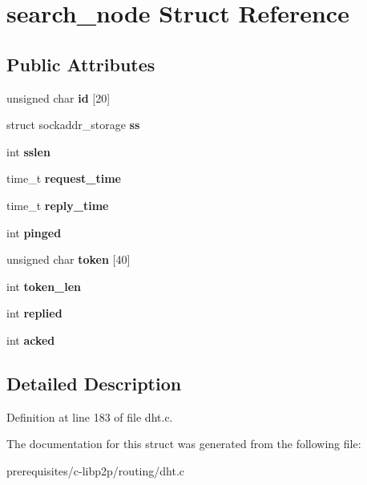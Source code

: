 \hypertarget{structsearch__node}{}\section{search\+\_\+node Struct Reference}
\label{structsearch__node}
\subsection*{Public Attributes}
\begin{DoxyCompactItemize}
\item 
\mbox{\label{structsearch__node_a9e5a0adadf95d8548aa5cd3756ef6497}} 
unsigned char {\bfseries id} \mbox{[}20\mbox{]}
\item 
\mbox{\label{structsearch__node_ae7257119f8e7ad1569d9b64b49a456da}} 
struct sockaddr\+\_\+storage {\bfseries ss}
\item 
\mbox{\label{structsearch__node_aeca56b7e722b0a6983cc7f2bfc233767}} 
int {\bfseries sslen}
\item 
\mbox{\label{structsearch__node_a5e2bca25509a4d775a10177dc406ca4a}} 
time\+\_\+t {\bfseries request\+\_\+time}
\item 
\mbox{\label{structsearch__node_addf3e690a79b8ac061c898a04484fa8f}} 
time\+\_\+t {\bfseries reply\+\_\+time}
\item 
\mbox{\label{structsearch__node_a580b0b0bdcb4408049b0b11dc7f42f06}} 
int {\bfseries pinged}
\item 
\mbox{\label{structsearch__node_adf871014475f15f9148de0e82cc34a4e}} 
unsigned char {\bfseries token} \mbox{[}40\mbox{]}
\item 
\mbox{\label{structsearch__node_a57002cc0b61c010db902e2a82cd489d5}} 
int {\bfseries token\+\_\+len}
\item 
\mbox{\label{structsearch__node_a0e59d7b3cedc8833e11f64aa54c9de66}} 
int {\bfseries replied}
\item 
\mbox{\label{structsearch__node_a03b5d1118f49fac6170aa25973985442}} 
int {\bfseries acked}
\end{DoxyCompactItemize}


\subsection{Detailed Description}


Definition at line 183 of file dht.\+c.



The documentation for this struct was generated from the following file\+:\begin{DoxyCompactItemize}
\item 
prerequisites/c-\/libp2p/routing/dht.\+c\end{DoxyCompactItemize}
